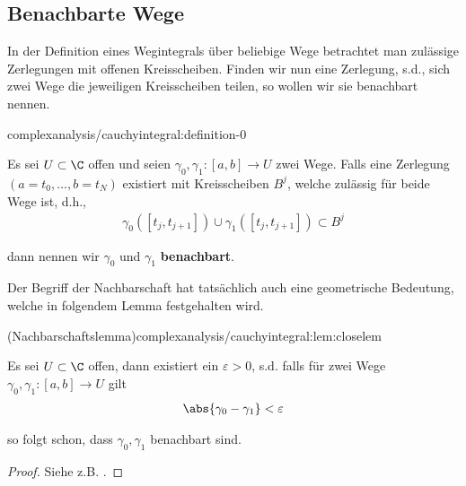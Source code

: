 \documentclass[letterpaper,10pt,german]{jupyterBook}
\begin{document}
\subsection{Benachbarte Wege}
\label{\detokenize{complexanalysis/cauchyintegral:benachbarte-wege}}
\par
In der Definition eines Wegintegrals über beliebige Wege betrachtet man zulässige Zerlegungen mit offenen Kreisscheiben. Finden wir nun eine Zerlegung, s.d., sich zwei Wege die jeweiligen Kreisscheiben teilen, so wollen wir sie benachbart nennen.
\begin{definition}{}{complexanalysis/cauchyintegral:definition-0}



\par
Es sei \(U\subset \C\) offen und seien \(\gamma_0,\gamma_1:[a,b]\to U\) zwei Wege. Falls eine Zerlegung \((a=t_0,\ldots,b=t_N)\) existiert mit Kreisscheiben \(B^j\), welche zulässig für beide Wege ist, d.h.,
\begin{align*}
\gamma_0([t_j, t_{j+1}])\cup \gamma_1([t_j,t_{j+1}]) \subset B^j
\end{align*}
\par
dann nennen wir \(\gamma_0\) und \(\gamma_1\) \textbf{benachbart}.
\end{definition}

\par
Der Begriff der Nachbarschaft hat tatsächlich auch eine geometrische Bedeutung, welche in folgendem Lemma festgehalten wird.
\begin{lemma}{(Nachbarschaftslemma)}{complexanalysis/cauchyintegral:lem:closelem}



\par
Es sei \(U\subset\C\) offen, dann existiert ein \(\varepsilon>0\), s.d. falls für zwei Wege \(\gamma_0,\gamma_1:[a,b]\to U\) gilt
\begin{align*}
\abs{\gamma_0 - \gamma_1} < \varepsilon
\end{align*}
\par
so folgt schon, dass \(\gamma_0,\gamma_1\) benachbart sind.
\end{lemma}

\begin{proof}
 Siehe z.B. \cite{Nee17}.
\end{proof}
\end{document}
